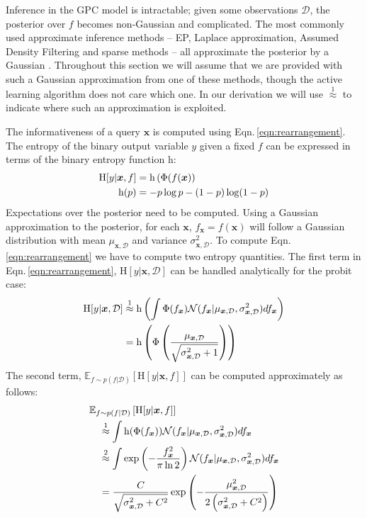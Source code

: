 \documentclass[twoside]{article}
\newcommand{\x}{\bm{x}}
\newcommand{\y}{y}
\newcommand{\data}{\mathcal{D}}
\newcommand{\E}{\mathbb{E}}
\newcommand{\rmh}{\mathrm{h}}
\newcommand{\rmH}{\mathrm{H}}
\begin{document}
Inference in the GPC model is intractable; given some observations $\data$, the posterior over $f$ becomes non-Gaussian and complicated. The most commonly used approximate inference methods -- EP,  Laplace approximation, Assumed Density Filtering and sparse methods -- all approximate the posterior by a Gaussian \cite{rasmussen2005}. Throughout this section we will assume that we are provided with such a Gaussian approximation from one of these methods, though the active learning algorithm does not care which one. In our derivation we will use {\scriptsize$\stackrel{1}{\approx}$} to indicate where such an approximation is exploited.

The informativeness of a query $\x$ is computed using Eqn.\,\eqref{eqn:rearrangement}.  The entropy of the binary output variable $\y$ given a fixed $f$ can be expressed in terms of the binary entropy function $\rmh$: 
\begin{align}
\rmH[y\vert\x,f] &= \rmh\left(\Phi(f(\x)\right) \notag\\
\rmh(p)&=- p\log p - (1-p)\log(1-p) \notag
\end{align}
Expectations over the posterior need to be computed. Using a Gaussian approximation to the posterior, for each $\x$, $f_{\x} = f(\x)$ will follow a Gaussian distribution with mean $\mu_{\x,\data}$ and variance $\sigma_{\x,\data}^2$. To compute Eqn.\,\eqref{eqn:rearrangement} we have to compute two entropy quantities. The first term in Eqn.\,\eqref{eqn:rearrangement}, $\rmH[y\vert\x,\data]$ can be handled analytically for the probit case:
\begin{align}
	\rmH[y\vert\x,\data] &\stackrel{1}{\approx} \rmh\left( \int \Phi( f_{\x} )  \mathcal{N}(f_{\x}\vert \mu_{\x,\data},\sigma_{\x,\data}^2) df_{\x} \right) \notag \\ 
	&= \rmh \left( \Phi\left( \frac{\mu_{\x,\data}}{\sqrt{\sigma^2_{\x,\data} + 1}} \right)\right) \label{ent_mean}
\end{align}
The second term, $\E_{f \sim p(f\vert\data)} \left[ \rmH[\y\vert\x, f] \right]$ can be computed approximately as follows:
\begin{align}
	&\E_{f \sim p(f\vert\data)} \left[ \rmH[\y\vert\x, f] \right] \notag\\	 
	&\quad \stackrel{1}{\approx}\int \rmh(\Phi(f_{\x})) \mathcal{N}(f_{\x}\vert \mu_{\x,\data},\sigma_{\x,\data}^2)df_{\x}\label{eqn:mean_entropy}\\
	&\quad\stackrel{2}{\approx} \int \exp\left(-\frac{f_{\x}^2}{\pi\ln2}\right) \mathcal{N}(f_{\x}\vert \mu_{\x,\data},\sigma_{\x,\data}^2)df_{\x}\notag\\	
	&\quad= \frac{C}{\sqrt{\sigma_{\x,\data}^2 + C^2}}\exp\left(-\frac{\mu_{\x,\data}^2}{2\left(\sigma_{\x,\data}^2 + C^2\right)}\right)\notag
\end{align}
\end{document}
